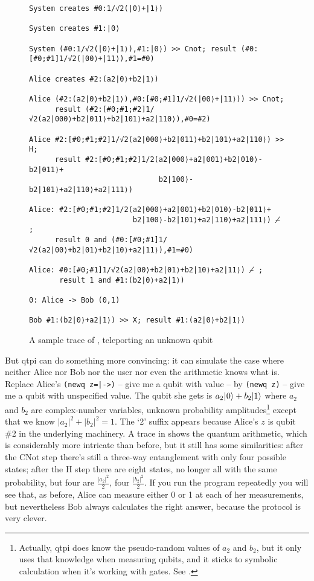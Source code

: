 \documentclass[11pt,a4paper]{article}
\newcommand{\verbtt}[1]{\texttt{\small{}#1}}
\begin{document}
\begin{figure}
\centering
\begin{verbatim}
System creates #0:1/√2(|0⟩+|1⟩)

System creates #1:|0⟩

System (#0:1/√2(|0⟩+|1⟩),#1:|0⟩) >> Cnot; result (#0:[#0;#1]1/√2(|00⟩+|11⟩),#1=#0)

Alice creates #2:(a2|0⟩+b2|1⟩)

Alice (#2:(a2|0⟩+b2|1⟩),#0:[#0;#1]1/√2(|00⟩+|11⟩)) >> Cnot; 
      result (#2:[#0;#1;#2]1/√2(a2|000⟩+b2|011⟩+b2|101⟩+a2|110⟩),#0=#2)

Alice #2:[#0;#1;#2]1/√2(a2|000⟩+b2|011⟩+b2|101⟩+a2|110⟩) >> H; 
      result #2:[#0;#1;#2]1/2(a2|000⟩+a2|001⟩+b2|010⟩-b2|011⟩+
                              b2|100⟩-b2|101⟩+a2|110⟩+a2|111⟩)

Alice: #2:[#0;#1;#2]1/2(a2|000⟩+a2|001⟩+b2|010⟩-b2|011⟩+
                        b2|100⟩-b2|101⟩+a2|110⟩+a2|111⟩) ⌢̸ ; 
      result 0 and (#0:[#0;#1]1/√2(a2|00⟩+b2|01⟩+b2|10⟩+a2|11⟩),#1=#0)

Alice: #0:[#0;#1]1/√2(a2|00⟩+b2|01⟩+b2|10⟩+a2|11⟩) ⌢̸ ; 
       result 1 and #1:(b2|0⟩+a2|1⟩)

0: Alice -> Bob (0,1)

Bob #1:(b2|0⟩+a2|1⟩) >> X; result #1:(a2|0⟩+b2|1⟩)
\end{verbatim}
\caption{A sample trace of , teleporting an unknown qubit}
\end{figure}

But qtpi can do something more convincing: it can simulate the case where neither Alice nor Bob nor the user nor even the arithmetic knows what \bv{\phi} is. Replace Alice's \verbtt{(newq z=|->)} -- give me a qubit with value \minus{} -- by \verbtt{(newq z)} -- give me a qubit with unspecified value. The qubit she gets is $a_{2}|\hspace{0.5pt}0\rangle+b_{2}|1\rangle$ where $a_{2}$ and $b_{2}$ are complex-number variables, unknown probability amplitudes\footnote{Actually, qtpi does know the pseudo-random values of $a_{2}$ and $b_{2}$, but it only uses that knowledge when measuring qubits, and it sticks to symbolic calculation when it's working with gates. See .} except that we know $|a_{2}|^{2}+|b_{2}|^{2}=1$. The `2' suffix appears because Alice's $z$ is qubit \#2 in the underlying machinery. A trace in  shows the quantum arithmetic, which is considerably more intricate than before, but it still has some similarities: after the CNot step there's still a three-way entanglement with only four possible states; after the H step there are eight states, no longer all with the same probability, but four are $\frac{|{a_{2}}|^{2}}{2}$, four $\frac{|{b_{2}}|^{2}}{2}$. If you run the program repeatedly you will see that, as before, Alice can measure either 0 or 1 at each of her measurements, but nevertheless Bob always calculates the right answer, because the protocol is very clever.
\end{document}
